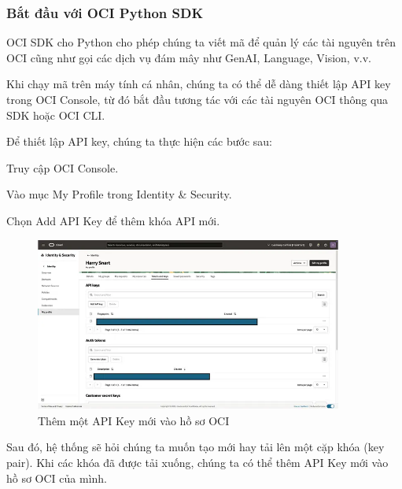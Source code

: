 \subsubsection{Bắt đầu với OCI Python SDK}
OCI SDK cho Python cho phép chúng ta viết mã để quản lý các tài nguyên trên OCI cũng như gọi các dịch vụ đám mây như GenAI, Language, Vision, v.v.

Khi chạy mã trên máy tính cá nhân, chúng ta có thể dễ dàng thiết lập API key trong OCI Console, từ đó bắt đầu tương tác với các tài nguyên OCI thông qua SDK hoặc OCI CLI.

Để thiết lập API key, chúng ta thực hiện các bước sau:
\begin{myitem}
    \item Truy cập OCI Console.

    \item Vào mục My Profile trong Identity \& Security.
    
    \item Chọn Add API Key để thêm khóa API mới.
\end{myitem}

\begin{figure}[H] %
    \centering
    \includegraphics[width=0.9\textwidth, keepaspectratio]{Demo/Them_API_key (1).jpg}
    \caption{Thêm một API Key mới vào hồ sơ OCI}
    \label{fig:cloud_intro}
\end{figure}

Sau đó, hệ thống sẽ hỏi chúng ta muốn tạo mới hay tải lên một cặp khóa (key pair). Khi các khóa đã được tải xuống, chúng ta có thể thêm API Key mới vào hồ sơ OCI của mình.

